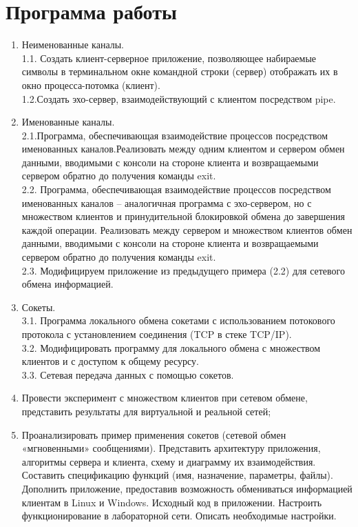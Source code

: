\documentclass[a4paper]{article}
\begin{document}
\section{Программа работы}
\begin{enumerate}
\item Неименованные каналы.\\
1.1. Создать клиент-серверное приложение, позволяющее набираемые символы в терминальном окне командной строки (сервер) отображать их в окно процесса-потомка (клиент).\\
1.2.Создать эхо-сервер, взаимодействующий с клиентом посредством pipe.
\item Именованные каналы.\\
2.1.Программа, обеспечивающая взаимодействие процессов посредством именованных каналов.Реализовать между одним клиентом и сервером обмен данными, вводимыми с консоли на стороне клиента и возвращаемыми сервером обратно до получения команды exit.\\
2.2. Программа, обеспечивающая взаимодействие процессов посредством именованных каналов – аналогичная программа с эхо-сервером, но с множеством клиентов и принудительной блокировкой обмена до завершения каждой операции. Реализовать между сервером и множеством клиентов обмен данными, вводимыми с консоли на стороне клиента и возвращаемыми сервером обратно до получения команды exit.\\
2.3. Модифицируем приложение из предыдущего примера (2.2) для сетевого обмена информацией.
\item Сокеты.\\
3.1. Программа локального обмена сокетами с использованием потокового протокола с установлением соединения (TCP в стеке TCP/IP).\\
3.2. Модифицировать программу для локального обмена с множеством клиентов и с доступом к общему ресурсу.\\
3.3. Сетевая передача данных с помощью сокетов.
\item  Провести эксперимент с множеством клиентов при сетевом обмене, представить результаты для виртуальной и реальной сетей;
\item  Проанализировать пример применения сокетов (сетевой обмен «мгновенными» сообщениями). Представить архитектуру приложения, алгоритмы сервера и клиента, схему и диаграмму их взаимодействия. Составить спецификацию функций (имя, назначение, параметры, файлы). Дополнить приложение, предоставив возможность обмениваться информацией клиентам в Linux и Windows. Исходный код в приложении. Настроить функционирование в лабораторной сети. Описать необходимые настройки.

\end{enumerate}
\end{document}
